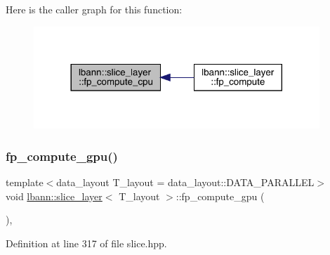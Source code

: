 Here is the caller graph for this function\+:\nopagebreak
\begin{figure}[H]
\begin{center}
\leavevmode
\includegraphics[width=305pt]{classlbann_1_1slice__layer_ab4c95d24916534cdff58b32916171ff2_icgraph}
\end{center}
\end{figure}
\mbox{\label{classlbann_1_1slice__layer_a875347929b9e4c0a70749da0dbb6469e}} 
\subsubsection{\texorpdfstring{fp\+\_\+compute\+\_\+gpu()}{fp\_compute\_gpu()}}
{\footnotesize\ttfamily template$<$data\+\_\+layout T\+\_\+layout = data\+\_\+layout\+::\+D\+A\+T\+A\+\_\+\+P\+A\+R\+A\+L\+L\+EL$>$ \\
void \hyperlink{classlbann_1_1slice__layer}{lbann\+::slice\+\_\+layer}$<$ T\+\_\+layout $>$\+::fp\+\_\+compute\+\_\+gpu (\begin{DoxyParamCaption}{ }\end{DoxyParamCaption})\hspace{0.3cm}{\ttfamily [inline]}, {\ttfamily [protected]}}



Definition at line 317 of file slice.\+hpp.


